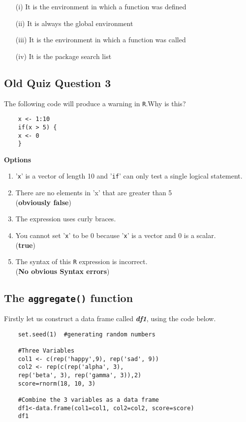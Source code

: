 \documentclass[]{article}
\begin{document}
\begin{itemize}
\item[(i)]
It is the environment in which a function was defined
\item[(ii)] It is always the global environment
\item[(iii)] It is the environment in which a function was called
\item[(iv)] It is the package search list
\end{itemize}
\newpage

\newpage
\subsection*{Old Quiz Question 3}
The following code will produce a warning in \texttt{R}.Why is this?
\begin{framed}
	\begin{verbatim}
	x <- 1:10
	if(x > 5) {
	x <- 0
	}
	\end{verbatim}
\end{framed}

\textbf{Options}
\begin{enumerate}
	\item '\texttt{x}' is a vector of length 10 and '\texttt{if}' can only test a single logical statement.
	\item There are no elements in 'x' that are greater than 5 \\ (\textbf{obviously false})
	\item The expression uses curly braces.
	\item You cannot set '\texttt{x}' to be 0 because '\texttt{x}' is a vector and 0 is a scalar. \\ (\textbf{true})
	\item The syntax of this \texttt{R} expression is incorrect.\\ (\textbf{No obvious Syntax errors})
\end{enumerate}

\newpage
\subsection*{The \texttt{aggregate()} function}
Firstly let us construct a data frame called \textit{\textbf{df1}}, using the code below.
\begin{framed}
	\begin{verbatim}
	set.seed(1)  #generating random numbers
	
	#Three Variables
	col1 <- c(rep('happy',9), rep('sad', 9)) 
	col2 <- rep(c(rep('alpha', 3), 
	rep('beta', 3), rep('gamma', 3)),2) 
	score=rnorm(18, 10, 3) 
	
	#Combine the 3 variables as a data frame
	df1<-data.frame(col1=col1, col2=col2, score=score) 
	df1
	\end{verbatim}
\end{framed}
\newpage
\end{document}
